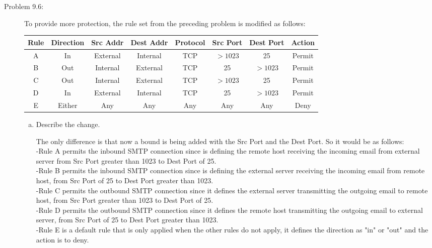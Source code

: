 \documentclass[12pt]{article}
\begin{document}
\begin{description}
    \item[Problem 9.6:]{\color{grey} To provide more protection, the rule set from the preceding problem is modified as follows:}\par
    \begin{center}
      \begin{tabular}{|c|c|c|c|c|c|c|c|}
        \hline
        \textbf{Rule} & \textbf{Direction} & \textbf{Src Addr} & \textbf{Dest Addr} & \textbf{Protocol} & \textbf{Src Port} & \textbf{Dest Port} & \textbf{Action} \\
        \hline
        A & In & External & Internal & TCP & $>1023$ & 25 & Permit \\
        \hline
        B & Out & Internal & External & TCP & 25 & $>1023$ & Permit \\
        \hline
        C & Out & Internal & External & TCP & $>1023$ & 25 & Permit \\
        \hline
        D & In & External & Internal & TCP & 25 & $>1023$ & Permit \\
        \hline
        E & Either & Any & Any & Any & Any & Any & Deny \\
        \hline
      \end{tabular}
    \end{center} \par
    \begin{enumerate}[a.]
        
        \item {\color{grey}Describe the change.} 
        
        The only difference is that now a bound is being added with the Src Port and the Dest Port. So it would be as follows:\\
         -Rule A permits the inbound SMTP connection since is defining the remote host receiving the incoming email from external server from Src Port greater than 1023 to Dest Port of 25.\\
        -Rule B permits the inbound SMTP connection since is defining the external server receiving the incoming email from remote host, from Src Port of 25 to Dest Port greater than 1023. \\
        -Rule C permits the outbound SMTP connection since it defines the external server transmitting the outgoing email to remote host, from Src Port greater than 1023 to Dest Port of 25. \\
        -Rule D permits the outbound SMTP connection since it defines the remote host transmitting the outgoing email to external server, from Src Port of 25 to Dest Port greater than 1023. \\
        -Rule E is a default rule that is only applied when the other rules do not apply, it defines the direction as "in" or "out" and the action is to deny. 
        

\end{enumerate}
\end{description}
\end{document}
